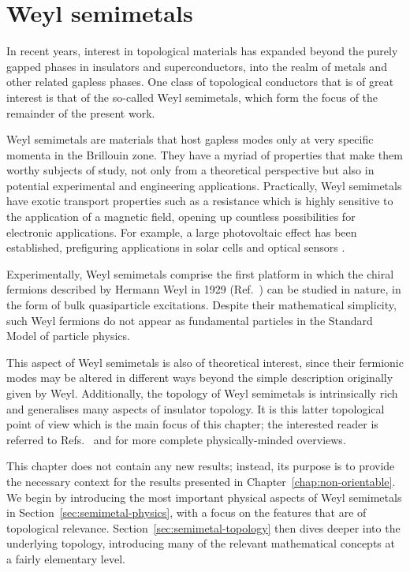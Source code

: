 \chapter{Weyl semimetals}\label{chap:WSM}

In recent years, interest in topological materials has expanded beyond the purely gapped phases in insulators and superconductors, into the realm of metals and other related gapless phases. One class of topological conductors that is of great interest is that of the so-called Weyl semimetals, which form the focus of the remainder of the present work.

Weyl semimetals are materials that host gapless modes only at very specific momenta in the Brillouin zone. They have a myriad of properties that make them worthy subjects of study, not only from a theoretical perspective but also in potential experimental and engineering applications. Practically, Weyl semimetals have exotic transport properties such as a resistance which is highly sensitive to the application of a magnetic field, opening up countless possibilities for electronic applications. For example, a large photovoltaic effect has been established, prefiguring applications in solar cells and optical sensors \cite{Osterhoudt_WSM-photovoltaic,Yang_WSM-photovoltaic}.

Experimentally, Weyl semimetals comprise the first platform in which the chiral fermions described by Hermann Weyl in 1929 (Ref.~\cite{Weyl_fermions}) can be studied in nature, in the form of bulk quasiparticle excitations. Despite their mathematical simplicity, such Weyl fermions do not appear as fundamental particles in the Standard Model of particle physics.

This aspect of Weyl semimetals is also of theoretical interest, since their fermionic modes may be altered in different ways beyond the simple description originally given by Weyl. Additionally, the topology of Weyl semimetals is intrinsically rich and generalises many aspects of insulator topology. It is this latter topological point of view which is the main focus of this chapter; the interested reader is referred to Refs.~\cite{Armitage_WSM-review} and \cite{Hosur_WSM-transport} for more complete physically-minded overviews.

This chapter does not contain any new results; instead, its purpose is to provide the necessary context for the results presented in Chapter~\ref{chap:non-orientable}. We begin by introducing the most important physical aspects of Weyl semimetals in Section~\ref{sec:semimetal-physics}, with a focus on the features that are of topological relevance. Section~\ref{sec:semimetal-topology} then dives deeper into the underlying topology, introducing many of the relevant mathematical concepts at a fairly elementary level.


